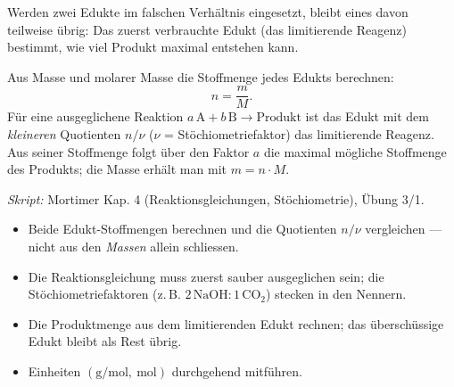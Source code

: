 

Werden zwei Edukte im falschen Verhältnis eingesetzt, bleibt eines davon
teilweise übrig: Das zuerst verbrauchte Edukt (das limitierende Reagenz)
bestimmt, wie viel Produkt maximal entstehen kann.

\begin{werkzeugkasten}
Aus Masse und molarer Masse die Stoffmenge jedes Edukts berechnen:
\begin{equation}
  n = \frac{m}{M}.
\end{equation}
Für eine ausgeglichene Reaktion
$a\,\mathrm{A} + b\,\mathrm{B} \rightarrow \mathrm{Produkt}$ ist das Edukt
mit dem \emph{kleineren} Quotienten $n/\nu$ ($\nu$ = Stöchiometriefaktor) das
limitierende Reagenz. Aus seiner Stoffmenge folgt über den Faktor $a$ die
maximal mögliche Stoffmenge des Produkts; die Masse erhält man mit
$m = n\cdot M$.

\textit{Skript:} Mortimer Kap. 4 (Reaktionsgleichungen, Stöchiometrie),
Übung 3/1.
\end{werkzeugkasten}

\begin{achtung}
\begin{itemize}
  \item Beide Edukt-Stoffmengen berechnen und die Quotienten $n/\nu$
        vergleichen --- nicht aus den \emph{Massen} allein schliessen.
  \item Die Reaktionsgleichung muss zuerst sauber ausgeglichen sein; die
        Stöchiometriefaktoren (z.\,B. $2\,\mathrm{NaOH} : 1\,\mathrm{CO_2}$)
        stecken in den Nennern.
  \item Die Produktmenge aus dem limitierenden Edukt rechnen; das
        überschüssige Edukt bleibt als Rest übrig.
  \item Einheiten $(\mathrm{g/mol},\ \mathrm{mol})$ durchgehend mitführen.
\end{itemize}
\end{achtung}
